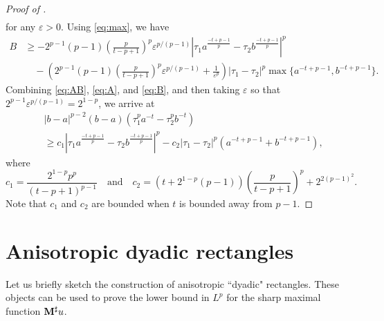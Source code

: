 \documentclass[11pt]{amsart}
\theoremstyle{plain}
\theoremstyle{definition}
\numberwithin{equation}{section}
\begin{document}
\begin{appendix}
\begin{proof} [Proof of ]
\begin{equation*}
\begin{split}
\end{split}
\end{equation*}
for any $\varepsilon > 0$. Using \eqref{eq:max}, we have
\begin{equation} \label{eq:B}
\begin{split}
B
&\geq - 2^{p-1} (p-1) \left( \frac{p}{t-p+1} \right)^p \varepsilon^{p/(p-1)} \left| \tau_1 a^{\frac{-t+p-1}{p}} - \tau_2 b^{\frac{-t+p-1}{p}} \right|^p \\
&\quad - \left( 2^{p-1} (p-1) \left( \frac{p}{t-p+1} \right)^p \varepsilon^{p/(p-1)} + \frac{1}{\varepsilon^p} \right) |\tau_1-\tau_2|^p \max \lbrace a^{-t+p-1}, b^{-t+p-1} \rbrace.
\end{split}
\end{equation}
Combining \eqref{eq:AB}, \eqref{eq:A}, and \eqref{eq:B}, and then taking $\varepsilon$ so that $2^{p-1} \varepsilon^{p/(p-1)} = 2^{1-p}$, we arrive at
\begin{equation*}
\begin{split}
&|b-a|^{p-2}(b-a)(\tau_1^p a^{-t} - \tau_2^p b^{-t}) \\
&\geq c_1 \left| \tau_1 a^{\frac{-t+p-1}{p}} - \tau_2 b^{\frac{-t+p-1}{p}} \right|^p - c_2 |\tau_1-\tau_2|^p \left( a^{-t+p-1} + b^{-t+p-1} \right),
\end{split}
\end{equation*}
where
\begin{equation*}
c_1 = \frac{2^{1-p} p^p}{(t-p+1)^{p-1}} \quad\text{and}\quad c_2 = \left( t+2^{1-p}(p-1) \right) \left( \frac{p}{t-p+1} \right)^p + 2^{2(p-1)^2}.
\end{equation*}
Note that $c_1$ and $c_2$ are bounded when $t$ is bounded away from $p-1$.
\end{proof}


\section{Anisotropic dyadic rectangles}\label{sec:anisorect}
Let us briefly sketch the construction of anisotropic ``dyadic" rectangles. These objects can be used to prove the lower bound in $L^p$ for the sharp maximal function ${\bf M}^{\sharp}u$.


\end{appendix}
\end{document}
